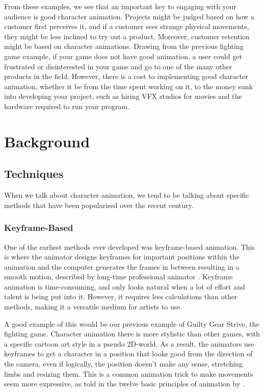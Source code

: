 \documentclass{l4proj}
\begin{document}
From these examples, we see that an important key to engaging with your audience is good character animation. Projects might be judged based on how a customer first perceives it, and if a customer sees strange physical movements, they might be less inclined to try out a product. Moreover, customer retention might be based on character animations. Drawing from the previous fighting game example, if your game does not have good animation, a user could get frustrated or disinterested in your game and go to one of the many other products in the field. However, there is a cost to implementing good character animation, whether it be from the time spent working on it, to the money sunk into developing your project, such as hiring VFX studios for movies and the hardware required to run your program.

\chapter{Background}

\section{Techniques}
When we talk about character animation, we tend to be talking about specific methods that have been popularised over the recent century.

\subsection{Keyframe-Based}
One of the earliest methods ever developed was keyframe-based animation. This is where the animator designs keyframes for important positions within the animation and the computer generates the frames in between resulting in a smooth motion, described by long-time professional animator \cite{survival09}. Keyframe animation is time-consuming, and only looks natural when a lot of effort and talent is being put into it. However, it requires less calculations than other methods, making it a versatile medium for artists to use.

A good example of this would be our previous example of Guilty Gear Strive, the fighting game. Character animation there is more stylistic than other games, with a specific cartoon art style in a pseudo 2D-world. As a result, the animators use keyframes to get a character in a position that looks good from the direction of the camera, even if logically, the position doesn't make any sense, stretching limbs and resizing them. This is a common animation trick to make movements seem more expressive, as told in the twelve basic principles of animation by \cite{disneyanimation81}.
\end{document}
